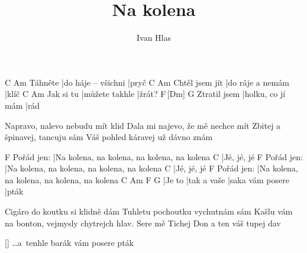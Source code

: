 \documentclass{song}
\title{Na kolena}
\author{Ivan Hlas}
\begin{document}
\strophe
        C                   Am
Táhněte |do háje -- všichni |pryč
               C                Am
Chtěl jsem jít |do ráje a nemám |klíč
          C              Am
Jak si tu |můžete takhle |žrát?
			 F\,[Dm]           G
Ztratil jsem |holku, co jí mám |rád
\endstrophe

\strophe*
Napravo, nalevo nebudu mít klid
Dala mi najevo, že mě nechce mít
Zbitej a špinavej, tancuju sám
Váš pohled káravej už dávno znám
\endstrophe

           F
Pořád jen: |Na kolena, na kolena, na kolena, na kolena
C
|Jé, jé, jé
           F
Pořád jen: |Na kolena, na kolena, na kolena, na kolena
C
|Jé, jé, jé
           F
Pořád jen: |Na kolena, na kolena, na kolena, na kolena
C      Am          F                G
|Je to |tak a vaše |saka vám posere |pták
\endstrophe

\strophe*
Cigáro do koutku si klidně dám
Tuhletu pochoutku vychutnám sám
Kašlu vám na bonton, vejmysly chytrejch hlav.
Sere mě Tichej Don a ten váš tupej dav
\endstrophe

\ref{} \ldots a~tenhle barák vám posere pták
\end{document}
